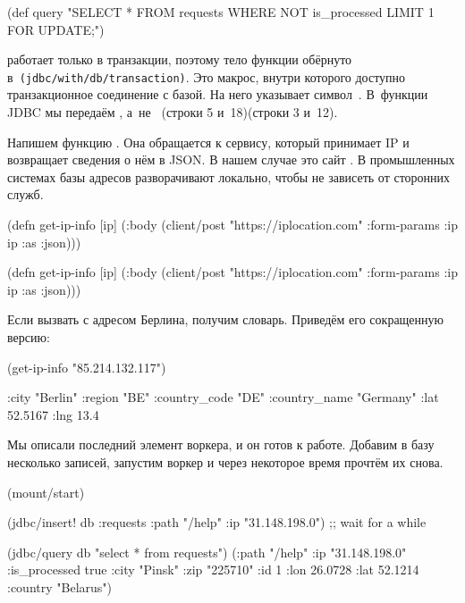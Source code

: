 \begin{clojure}
(def query
  "SELECT * FROM requests WHERE NOT is_processed
   LIMIT 1 FOR UPDATE;")
\end{clojure}

\fi

 работает только в транзакции, поэтому тело функции обёрнуто
в~\texttt{(jdbc/with\-/db\-/transaction)}. Это макрос, внутри которого доступно
транзакционное соединение с базой. На него указывает символ~. В~функции
JDBC мы передаём , а~не~ \ifnarrow(строки 5 и~18)\else(строки 3 и~12)\fi.


Напишем функцию . Она обращается к сервису, который принимает
IP и возвращает сведения о нём в JSON. В нашем случае это сайт
. В промышленных системах базы адресов разворачивают
локально, чтобы не зависеть от сторонних служб.

\ifnarrow

\begin{clojure}
(defn get-ip-info [ip]
  (:body (client/post
           "https://iplocation.com"
           {:form-params {:ip ip}
            :as :json})))
\end{clojure}

\else

\begin{clojure}
(defn get-ip-info [ip]
  (:body (client/post "https://iplocation.com"
                      {:form-params {:ip ip}
                       :as :json})))
\end{clojure}

\fi

\noindent
Если вызвать  с адресом Берлина, получим словарь. Приведём его
сокращенную версию:

\begin{clojure}
(get-ip-info "85.214.132.117")

{:city "Berlin"
 :region "BE"
 :country_code "DE"
 :country_name "Germany"
 :lat 52.5167
 :lng 13.4}
\end{clojure}

Мы описали последний элемент воркера, и он готов к работе. Добавим в базу
несколько записей, запустим воркер и через некоторое время прочтём их снова.

\pagebreaklarge[3]

\ifnarrow

\begin{clojure}
(mount/start)

(jdbc/insert! db :requests
  {:path "/help" :ip "31.148.198.0"})
;; wait for a while

(jdbc/query db "select * from requests")
({:path "/help"
  :ip "31.148.198.0"
  :is_processed true
  :city "Pinsk"
  :zip "225710" :id 1
  :lon 26.0728 :lat 52.1214
  :country "Belarus"})
\end{clojure}


